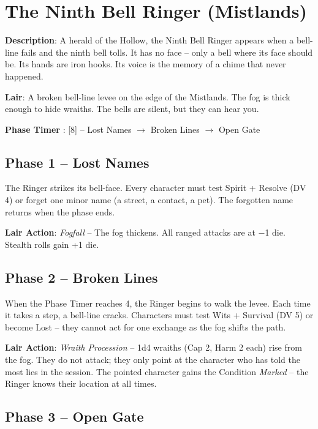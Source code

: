 \section*{The Ninth Bell Ringer (Mistlands)}

\noindent\textbf{Description}: A herald of the Hollow, the Ninth Bell Ringer appears when a bell-line fails and the ninth bell tolls. It has no face -- only a bell where its face should be. Its hands are iron hooks. Its voice is the memory of a chime that never happened.

\noindent\textbf{Lair}: A broken bell-line levee on the edge of the Mistlands. The fog is thick enough to hide wraiths. The bells are silent, but they can hear you.

\noindent\textbf{Phase Timer }: [8] -- Lost Names $\rightarrow$ Broken Lines $\rightarrow$ Open Gate

\subsection*{Phase 1 -- Lost Names}

\noindent The Ringer strikes its bell-face. Every character must test Spirit + Resolve (DV 4) or forget one minor name (a street, a contact, a pet). The forgotten name returns when the phase ends.

\noindent\textbf{Lair Action}: \emph{Fogfall} -- The fog thickens. All ranged attacks are at −1 die. Stealth rolls gain +1 die.

\subsection*{Phase 2 -- Broken Lines}

\noindent When the Phase Timer reaches 4, the Ringer begins to walk the levee. Each time it takes a step, a bell-line cracks. Characters must test Wits + Survival (DV 5) or become Lost -- they cannot act for one exchange as the fog shifts the path.

\noindent\textbf{Lair Action}: \emph{Wraith Procession} -- 1d4 wraiths (Cap 2, Harm 2 each) rise from the fog. They do not attack; they only point at the character who has told the most lies in the session. The pointed character gains the Condition \emph{Marked} -- the Ringer knows their location at all times.

\subsection*{Phase 3 -- Open Gate}

